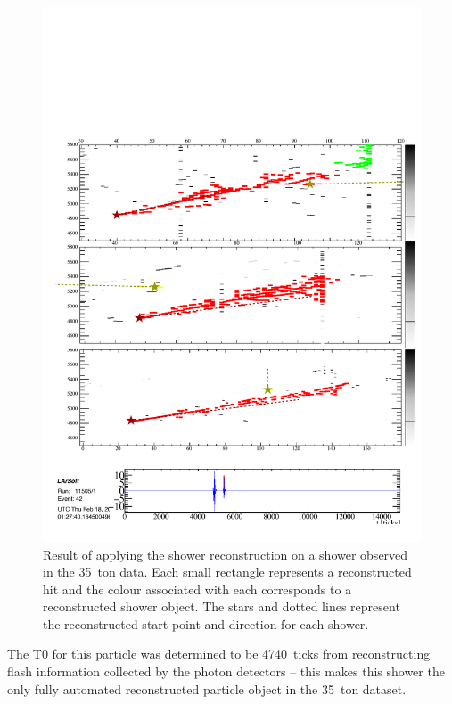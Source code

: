 \begin{figure}
  \centering
  \includegraphics[width=12cm]{FamousShowerReconstructed.pdf}
  \caption[Result of applying the shower reconstruction on a shower observed in the 35~ton data.]{Result of applying the shower reconstruction on a shower observed in the 35~ton data.  Each small rectangle represents a reconstructed hit and the colour associated with each corresponds to a reconstructed shower object.  The stars and dotted lines represent the reconstructed start point and direction for each shower.}
  \label{fig:FamousShowerReconstructed}
\end{figure}

The T0 for this particle was determined to be 4740~ticks from reconstructing flash information collected by the photon detectors -- this makes this shower the only fully automated reconstructed particle object in the 35~ton dataset.

